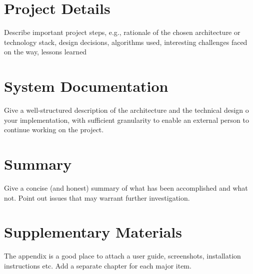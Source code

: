 \documentclass[notitlepage,english]{hgbreport}
\begin{document}
\chapter{Project Details}

Describe important project steps, e.g., rationale of the chosen architecture or technology stack, 
design decisions, algorithms used, interesting challenges faced on the way, lessons 
learned \etc




\chapter{System Documentation}

Give a well-structured description of the architecture and the technical design
o your implementation,
with sufficient granularity to enable an external person to
continue working on the project.


\chapter{Summary}

Give a concise (and honest) summary of what has been accomplished and what not. 
Point out issues that may warrant further investigation.


\appendix %


\chapter{Supplementary Materials}

The appendix is a good place to attach a user guide, screenshots, installation instructions etc.
Add a separate chapter for each major item.


\MakeBibliography[nosplit]
\end{document}
